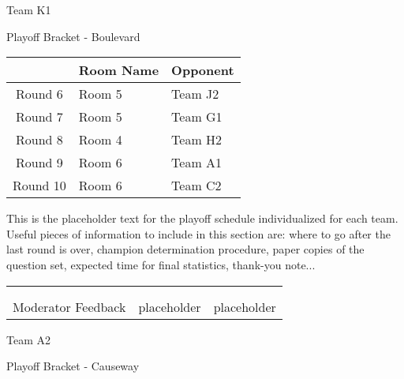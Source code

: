 \documentclass{article}%
\begin{document}
\newpage%
\begin{center}%
\begin{Huge}%
Team K1%
\end{Huge}%
\vspace*{12pt}%
\linebreak%
\begin{Large}%
Playoff Bracket {-} Boulevard%
\end{Large}%
\end{center}%
\vspace*{4pt}%
%
\begin{tabularx}{\textwidth}{|c|Y|Y|}%
\hline%
&Room Name&Opponent\\%
\hline%
Round 6&Room 5&Team J2\\%
Round 7&Room 5&Team G1\\%
Round 8&Room 4&Team H2\\%
Round 9&Room 6&Team A1\\%
Round 10&Room 6&Team C2\\%
\hline%
\end{tabularx}%
\vspace*{30pt}%
\linebreak%
This is the placeholder text for the playoff schedule individualized for each team. Useful pieces of information to include in this section are: where to go after the last round is over, champion determination procedure, paper copies of the question set, expected time for final statistics, thank{-}you note...%
\vspace*{30pt}%
\newline%
%
\begin{tabularx}{\textwidth}{YYY}%
  &  &  \\%
\\%
Moderator Feedback&placeholder&placeholder\\%
\end{tabularx}%
\newpage%
\begin{center}%
\begin{Huge}%
Team A2%
\end{Huge}%
\vspace*{12pt}%
\linebreak%
\begin{Large}%
Playoff Bracket {-} Causeway%
\end{Large}%
\end{center}%
\end{document}
